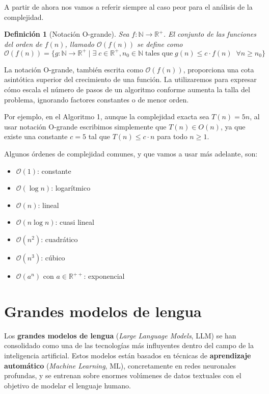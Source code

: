 \documentclass[12pt,twoside]{article}
\newtheorem{definition}[theorem]{Definición}
\begin{document}
A partir de ahora nos vamos a referir siempre al caso peor para el análisis de la complejidad.

\begin{definition}[Notación O-grande]
Sea $f:\mathbb{N}\rightarrow\mathbb{R}^{+}$. El conjunto de las funciones del orden de $f(n)$, llamado $\mathcal{O}(f(n))$ se define como $$\mathcal{O}(f(n))=\{g:\mathbb{N}\rightarrow\mathbb{R}^{+}\mid\exists \;c\in\mathbb{R}^{+},n_{0}\in\mathbb{N}\; \text{tales que}\; g(n)\leq c\cdot f(n)\;\;\forall n\geq n_{0}\}$$
\end{definition}

La notación O-grande, también escrita como $\mathcal{O}(f(n))$, proporciona una cota asintótica superior del crecimiento de una función. La utilizaremos para expresar cómo escala el número de pasos de un algoritmo conforme aumenta la talla del problema, ignorando factores constantes o de menor orden.

Por ejemplo, en el Algoritmo 1, aunque la complejidad exacta sea $T(n) = 5n$, al usar notación O-grande escribimos simplemente que $T(n) \in O(n)$, ya que existe una constante $c=5$ tal que $T(n) \leq c \cdot n$ para todo $n \geq 1$.

Algunos órdenes de complejidad comunes, y que vamos a usar más adelante, son:
\begin{itemize}
    \item $\mathcal{O}(1)$: constante
    \item $\mathcal{O}(\log n)$: logarítmico
    \item $\mathcal{O}(n)$: lineal
    \item $\mathcal{O}(n\log n)$: cuasi lineal
    \item $\mathcal{O}(n^2)$: cuadrático
    \item $\mathcal{O}(n^3)$: cúbico
    \item $\mathcal{O}(a^n)$ con $a\in\mathbb{R}^{++}$: exponencial
\end{itemize}

\section{Grandes modelos de lengua}
Los \textbf{grandes modelos de lengua} (\textit{Large Language Models}, LLM) \cite{libro} se han consolidado como una de las tecnologías más influyentes dentro del campo de la inteligencia artificial. Estos modelos están basados en técnicas de \textbf{aprendizaje automático} (\textit{Machine Learning}, ML), concretamente en redes neuronales profundas, y se entrenan sobre enormes volúmenes de datos textuales con el objetivo de modelar el lenguaje humano.
\end{document}

